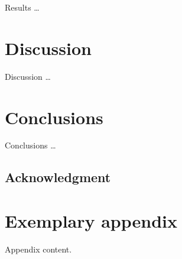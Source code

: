 \documentclass[]{einformatica}
\begin{document}
Results \dots 

\section{Discussion}\label{sec:Discussion}

Discussion \dots


\section{Conclusions}\label{sec:Conclusions}

Conclusions \dots


\subsection*{Acknowledgment}


\Data{\NA}



 




\appendix
\makeatletter
\def\mw@seccntformat#1{Appendix\ #1.\enspace}
\makeatother

\section{Exemplary appendix}\label{sec:A}

Appendix content. 
\end{document}
